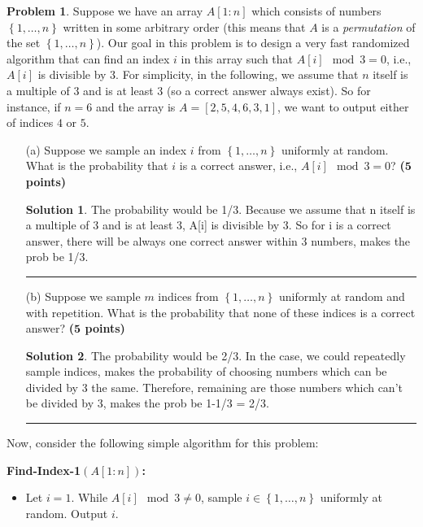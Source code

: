 \documentclass{article}
\theoremstyle{definition}
\newtheorem{problem}{Problem}
\def\fline{\rule{0.75\linewidth}{0.5pt}}
\newcommand{\finishline}{\begin{center}\fline\end{center}}
\newtheorem*{solution*}{Solution}
\newenvironment{solution}{\begin{solution*}}{{\finishline} \end{solution*}}
\newcommand{\grade}[1]{\hfill{\textbf{($\mathbf{#1}$ points)}}}
\newcommand{\set}[1]{\ensuremath{\left\{ #1 \right\}}}
\begin{document}
\begin{problem}
Suppose we have an array $A[1:n]$ which consists of numbers $\set{1,\ldots,n}$ written in some arbitrary order (this means that $A$ is a \emph{permutation} of the set $\set{1,\ldots,n}$). 
Our goal in this problem is to design a very fast randomized algorithm that can find an index $i$ in this array such that $A[i] \mod 3 = 0$, i.e., $A[i]$ is divisible by $3$. For simplicity, in the following, we assume that $n$ itself is a multiple of $3$ and 
is at least $3$ (so a correct answer always exist). 
So for instance, if $n=6$ and the array is $A=[2,5,4,6,3,1]$, we want to output either of indices $4$ or $5$. 

\begin{enumerate}
\item[(a)]	Suppose we sample an index $i$ from $\set{1,\ldots,n}$ uniformly at random. What is the probability that $i$ is a correct answer, i.e., $A[i] \mod 3 = 0$? \grade{5} 


	\begin{solution}
		
		The probability would be 1/3. Because we assume that n itself is a multiple of 3 and is at least 3, A[i] is divisible by 3. So for i is a correct answer, there will be always one correct answer within 3 numbers, makes the prob be 1/3. \\
		
	\end{solution}
	
\item[(b)] Suppose we sample $m$ indices from $\set{1,\ldots,n}$ uniformly at random and with repetition. What is the probability that none of these indices is a correct answer?  \grade{5}


	\begin{solution}
		
		The probability would be 2/3. In the case, we could repeatedly sample indices, makes the probability of choosing numbers which can be divided by 3 the same. Therefore, remaining are those numbers which can't be divided by 3, makes the prob be 1-1/3 = 2/3. \\
		
	\end{solution}
	
\end{enumerate}

Now, consider the following simple algorithm for this problem: 


\textbf{Find-Index-1$(A[1:n])$:} 
\begin{itemize}
	\item Let $i=1$.  While $A[i] \mod 3 \neq 0$, sample $i \in \set{1,\ldots,n}$ uniformly at random. Output $i$. 
\end{itemize}


\end{problem}
\end{document}
